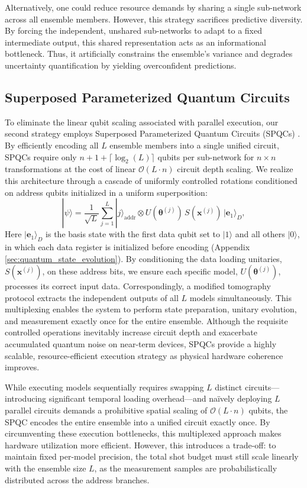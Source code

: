 \documentclass{iopjournal}
\begin{document}
Alternatively, one could reduce resource demands by sharing a single sub-network across all ensemble members. However, this strategy sacrifices predictive diversity. By forcing the independent, unshared sub-networks to adapt to a fixed intermediate output, this shared representation acts as an informational bottleneck. Thus, it artificially constrains the ensemble's variance and degrades uncertainty quantification by yielding overconfident predictions.

\subsection{Superposed Parameterized Quantum Circuits}

To eliminate the linear qubit scaling associated with parallel execution, our second strategy employs Superposed Parameterized Quantum Circuits (SPQCs) \cite{patapovich2025spqc}. By efficiently encoding all $L$ ensemble members into a single unified circuit, SPQCs require only $n + 1 + \lceil\log_2(L)\rceil$ qubits per sub-network for $n \times n$ transformations at the cost of linear $\mathcal{O}(L \cdot n)$ circuit depth scaling. We realize this architecture through a cascade of uniformly controlled rotations conditioned on address qubits initialized in a uniform superposition:
\[
    |\psi\rangle = \frac{1}{\sqrt{L}} \sum_{j=1}^{L}
    |j\rangle_{\mathrm{addr}} \otimes U(\boldsymbol{\theta}^{(j)})\,S(\mathbf{x}^{(j)})\,|\mathbf{e}_1\rangle_{D},
\]
Here $|\mathbf{e}_1\rangle_{D}$ is the basis state with the first data qubit set to $|1\rangle$ and all others $|0\rangle$, in which each data register is initialized before encoding (Appendix \ref{sec:quantum_state_evolution}). By conditioning the data loading unitaries, $S(\mathbf{x}^{(j)})$, on these address bits, we ensure each specific model, $U(\boldsymbol{\theta}^{(j)})$, processes its correct input data. Correspondingly, a modified tomography protocol extracts the independent outputs of all $L$ models simultaneously. This multiplexing enables the system to perform state preparation, unitary evolution, and measurement exactly once for the entire ensemble. Although the requisite controlled operations inevitably increase circuit depth and exacerbate accumulated quantum noise on near-term devices, SPQCs provide a highly scalable, resource-efficient execution strategy as physical hardware coherence improves. 

While executing models sequentially requires swapping $L$ distinct circuits—introducing significant temporal loading overhead—and naïvely deploying $L$ parallel circuits demands a prohibitive spatial scaling of $\mathcal{O}(L \cdot n)$ qubits, the SPQC encodes the entire ensemble into a unified circuit exactly once. By circumventing these execution bottlenecks, this multiplexed approach makes hardware utilization more efficient. However, this introduces a trade-off: to maintain fixed per-model precision, the total shot budget must still scale linearly with the ensemble size $L$, as the measurement samples are probabilistically distributed across the address branches.
\end{document}
